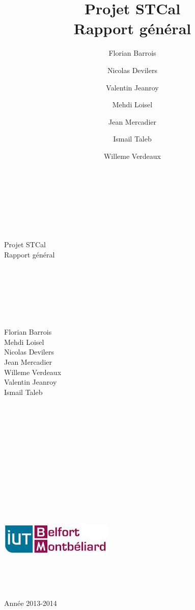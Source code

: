 \documentclass[a4paper,10pt]{report}
\date{}
\title{\Huge{Projet STCal}\\ {\Large Rapport général}}
\author{Florian Barrois \and Nicolas Devilers \and Valentin Jeanroy \and Mehdi Loisel \and Jean Mercadier \and Ismail Taleb \and Willeme Verdeaux}
\begin{document}
 \begin{titlepage}

\begin{center}
~\\~\\~\\~\\~\\
\Huge
Projet STCal\\
\LARGE
Rapport général\\
~\\~\\~\\~\\~\\~\\
\begin{multicols}{3}
\large
Florian Barrois\\Mehdi Loisel\\
\columnbreak 
Nicolas Devilers\\Jean Mercadier\\Willeme Verdeaux\\
\columnbreak
Valentin Jeanroy\\Ismail Taleb
\end{multicols}
\end{center}


\begin{center}
~\\~\\~\\~\\~\\~\\~\\~\\~\\~\\~\\~\\
 \includegraphics{iutbm.jpeg}
 ~\\~\\~\\~\\~\\
\large
Année 2013-2014
\end{center}

\end{titlepage}
\end{document}

